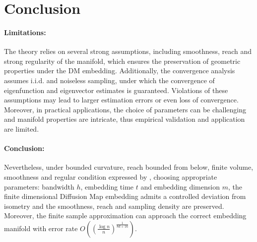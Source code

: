 	\section{Conclusion}
\label{sec:conclusion}
\paragraph*{Limitations:}The theory relies on several strong assumptions, including smoothness, reach and strong regularity of the manifold, which ensures the preservation of geometric properties under the DM embedding. Additionally, the convergence analysis assumes i.i.d. and noiseless sampling, under which the convergence of eigenfunction and eigenvector estimates is guaranteed. Violations of these assumptions may lead to larger estimation errors or even loss of convergence. Moreover, in practical applications, the choice of parameters can be challenging and manifold properties are intricate, thus empirical validation and application are limited.
\paragraph*{Conclusion:}Nevertheless, under bounded curvature, reach bounded from below, finite volume, smoothness and regular condition expressed by , choosing appropriate parameters: bandwidth $h$, embedding time $t$ and embedding dimension $m$, the finite dimensional Diffusion Map embedding admits a controlled deviation from isometry and the smoothness, reach and sampling density are preserved. Moreover, the finite sample approximation can approach the correct embedding manifold with error rate $O\left((\frac{\log n}{n})^{\frac{1}{8d+16}}\right)$. 